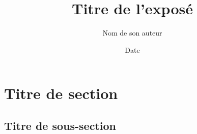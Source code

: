 \documentclass{beamer}
\title{Titre de l'exposé}
\author{Nom de son auteur}
\date{Date}	%
\begin{document}
\frame{\titlepage}

\section{Titre de section}
\frame{\sectionpage}

\subsection{Titre de sous-section}
\frame{\subsectionpage}
\end{document}
